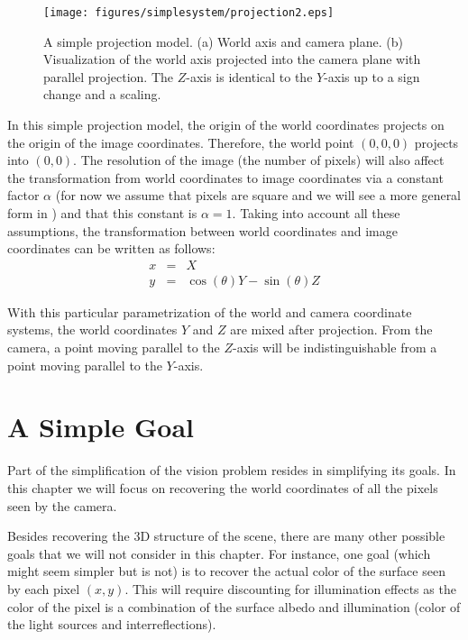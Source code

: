 \begin{figure}[t]
\centerline{
\texttt{[image: figures/simplesystem/projection2.eps]}
} 
\caption{A simple projection model. (a) World axis and camera plane. (b) Visualization of the world axis projected into the camera plane with parallel projection. The $Z$-axis is identical to the $Y$-axis up to a sign change and a scaling.} 
\label{fig:projection}
\end{figure}

In this simple projection model, the origin of the world coordinates projects on the origin of the image coordinates. Therefore, the world point $(0,0,0)$ projects into $(0,0)$.
The resolution of the image (the number of pixels) will also affect the transformation from world coordinates to image coordinates via a constant factor $\alpha$ (for now we assume that pixels are square and we will see a more general form in \sect{\ref{sec:camera_parameters}}) and that this constant is $\alpha=1$. Taking into account all these assumptions, the transformation between world coordinates and image coordinates can be written as follows: 
\begin{eqnarray}
x &=& X \\
y &=&  \cos(\theta) Y - \sin(\theta) Z 
\label{eq:projection}
\end{eqnarray}




With this particular parametrization of the world and camera coordinate systems, the world coordinates $Y$ and $Z$ are mixed after projection.  From the camera, a point moving parallel to the $Z$-axis will be indistinguishable from a point moving parallel to the $Y$-axis.


\section{A Simple Goal}

Part of the simplification of the vision problem resides in simplifying its goals. In this chapter we will focus on recovering the world coordinates of all the pixels seen by the camera. 

Besides recovering the 3D structure of the scene, there are many other possible goals that we will not consider in this chapter. For instance, one goal (which might seem simpler but is not) is to recover the actual color of the surface seen by each pixel $(x,y)$. This will require discounting for illumination effects as the color of the pixel is a combination of the surface albedo and illumination (color of the light sources and interreflections). 


